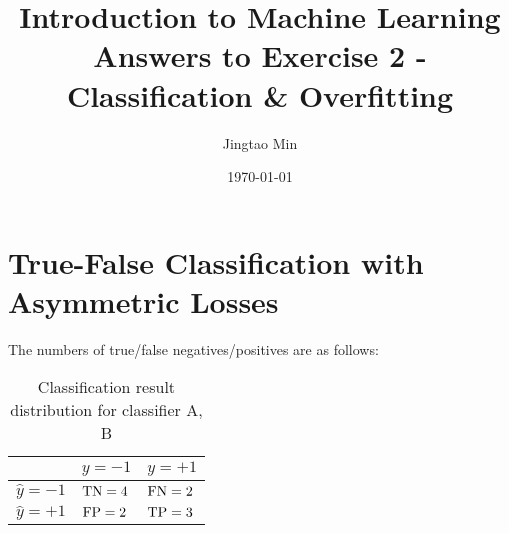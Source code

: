 \documentclass[a4paper, 10pt]{article}
\title{\bfseries Introduction to Machine Learning \\ Answers to Exercise 2 - Classification \& Overfitting}
\author{Jingtao Min}
\date{\today}
\newcommand{\annot}[1]{{\rm #1}}
\begin{document}
\maketitle

\section{True-False Classification with Asymmetric Losses}

The numbers of true/false negatives/positives are as follows:
\begin{table}[htbp]
    \centering
    \caption{Classification result distribution for classifier A, B}
    \label{tab:class-results}
    
    \begin{tabular}{lll}
        \toprule
        & $y=-1$ & $y=+1$ \\ 
        \midrule
        $\hat{y}=-1$ & $\annot{TN} = 4$ & $\annot{FN} = 2$\\
        $\hat{y}=+1$ & $\annot{FP} = 2$ & $\annot{TP} = 3$ \\
        \bottomrule
    \end{tabular}
\end{table}
\end{document}
